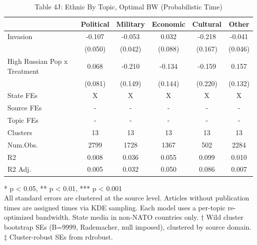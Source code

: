 \begin{table}[!t]
\caption{Table 4J: Ethnic By Topic, Optimal BW (Probabilistic Time)} 
\fontsize{12.0pt}{14.4pt}\selectfont
\begin{tabular*}{\linewidth}{@{\extracolsep{\fill}}lccccc}
\toprule
  & Political & Military & Economic & Cultural & Other \\ 
\midrule\addlinespace[2.5pt]
Invasion & -0.107 & -0.053 & 0.032 & -0.218 & -0.041 \\ 
 & (0.050) & (0.042) & (0.088) & (0.167) & (0.046) \\ 
High Russian Pop x Treatment & 0.068 & -0.210 & -0.134 & -0.159 & 0.157 \\ 
{} & {(0.081)} & {(0.149)} & {(0.144)} & {(0.220)} & {(0.132)} \\ 
State FEs & X & X & X & X & X \\ 
Source FEs & - & - & - & - & - \\ 
Topic FEs & - & - & - & - & - \\ 
Clusters & 13 & 13 & 13 & 13 & 13 \\ 
Num.Obs. & 2799 & 1728 & 1367 & 502 & 2284 \\ 
R2 & 0.008 & 0.036 & 0.055 & 0.099 & 0.010 \\ 
R2 Adj. & 0.005 & 0.032 & 0.050 & 0.086 & 0.007 \\ 
\bottomrule
\end{tabular*}
\begin{minipage}{\linewidth}
* p < 0.05, ** p < 0.01, *** p < 0.001\\
All standard errors are clustered at the source level. Articles without
publication times are assigned times via KDE sampling. Each model uses a
per-topic re-optimized bandwidth. State media in non-NATO countries only. † Wild
cluster bootstrap SEs (B=9999, Rademacher, null imposed), clustered by source
domain. ‡ Cluster-robust SEs from rdrobust.\\
\end{minipage}
\end{table}

